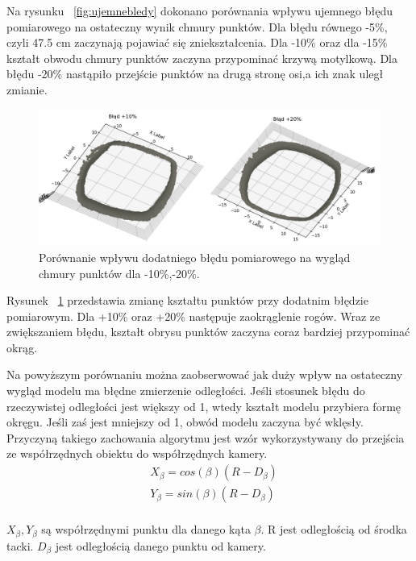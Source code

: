 Na rysunku ~\ref{fig:ujemnebledy} dokonano porównania wpływu ujemnego błędu pomiarowego na ostateczny wynik chmury punktów. Dla błędu równego -5\%, czyli 47.5 cm zaczynają pojawiać się zniekształcenia. Dla -10\% oraz dla -15\% kształt obwodu chmury punktów zaczyna przypominać krzywą motylkową. Dla błędu -20\% nastąpiło przejście punktów na drugą stronę osi,a ich znak uległ zmianie.
\begin{figure}[H]
  \centering
  \includegraphics[scale=0.4]{bledydodatnie.png}
  \caption{Porównanie wpływu dodatniego błędu pomiarowego na wygląd chmury punktów dla -10\%,-20\%.}   
  \label{fig:dodatniebledy}
\end{figure}
Rysunek ~\ref{fig:dodatniebledy} przedstawia zmianę kształtu punktów przy dodatnim błędzie pomiarowym. Dla +10\% oraz +20\% następuje zaokrąglenie rogów. Wraz ze zwiększaniem błędu, kształt obrysu punktów zaczyna coraz bardziej przypominać okrąg.

Na powyższym porównaniu można zaobserwować jak duży wpływ na ostateczny wygląd modelu ma błędne zmierzenie odległości. Jeśli stosunek błędu do rzeczywistej odległości jest większy od 1, wtedy kształt modelu przybiera formę okręgu. Jeśli zaś jest mniejszy od 1, obwód modelu zaczyna być wklęsły. Przyczyną takiego zachowania algorytmu jest wzór wykorzystywany do przejścia ze współrzędnych obiektu do współrzędnych kamery. 
\begin{equation}
    \begin{aligned}
            & X_{\beta}=cos(\beta)(R-D_{\beta})  \\
            & Y_{\beta}=sin(\beta)(R-D_{\beta})  \\
    \end{aligned}
\end{equation}

$X_{\beta},Y_{\beta}$ są współrzędnymi punktu dla danego kąta $\beta$. R jest odległością od środka tacki. $D_{\beta}$ jest odległością danego punktu od kamery.

